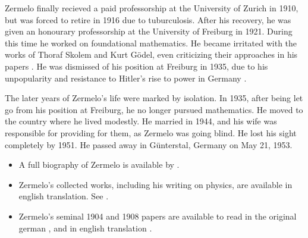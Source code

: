 \documentclass[../../../include/open-logic-section]{subfiles}
\begin{document}
Zermelo finally recieved a paid professorship at the University of Zurich
in 1910, but was forced to retire in 1916 due to tuburculosis. After his
recovery, he was given an honourary professorship at the University of
Freiburg in 1921. During this time he worked on foundational mathematics.
He became irritated with the works of Thoraf Skolem and Kurt G\"{o}del,
even criticizing their approaches in his papers \citep[31]{Ebbinghaus2010}.
He was dismissed of his position at Freiburg in 1935, due to his
unpopularity and resistance to Hitler's rise to power in Germany
\citep[32]{Ebbinghaus2015}.
 
The later years of Zermelo's life were marked by isolation. In 1935, after
being let go from his position at Freiburg, he no longer pursued
mathematics. He moved to the country where he lived modestly. He married in
1944, and his wife was responsible for providing for them, as Zermelo was
going blind. He lost his sight completely by 1951. He passed away in
G\"{u}nterstal, Germany on May 21, 1953. 

\begin{reading}

\begin{itemize} 
\item A full biography of Zermelo is available by \citet{Ebbinghaus2015}.

\item Zermelo's collected works, including his writing on physics, are 
available in english translation. See \citet{Ebbinghaus2010,Ebbinghaus2013}.

\item Zermelo's seminal 1904 and 1908 papers are available to read in the
original german \citep{Zermelo1904,Zermelo1908}, and in english translation
 \citep{Ebbinghaus2013}.

\end{itemize}
 \end{reading}
\end{document}
